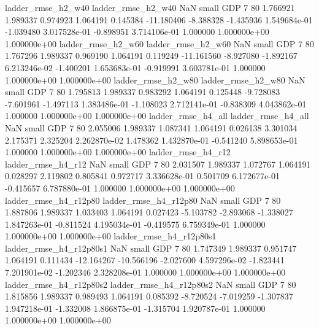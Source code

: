       ladder_rmse_h2_w40       ladder_rmse_h2_w40                   NaN      small      GDP                 7 80 1.766921       1.989337 0.974923       1.064191    0.145384    -11.180406     -8.388328    -1.435936   1.549684e-01 -1.039480 3.017528e-01    -0.898951   3.714106e-01            1.000000    1.000000e+00        1.000000e+00
      ladder_rmse_h2_w60       ladder_rmse_h2_w60                   NaN      small      GDP                 7 80 1.767296       1.989337 0.969190       1.064191    0.119249    -11.161560     -8.927080    -1.892167   6.213246e-02 -1.400201 1.653683e-01    -0.919991   3.603781e-01            1.000000    1.000000e+00        1.000000e+00
      ladder_rmse_h2_w80       ladder_rmse_h2_w80                   NaN      small      GDP                 7 80 1.795813       1.989337 0.983292       1.064191    0.125448     -9.728083     -7.601961    -1.497113   1.383486e-01 -1.108023 2.712141e-01    -0.838309   4.043862e-01            1.000000    1.000000e+00        1.000000e+00
      ladder_rmse_h4_all       ladder_rmse_h4_all                   NaN      small      GDP                 7 80 2.055006       1.989337 1.087341       1.064191    0.026138      3.301034      2.175371     2.325204   2.262870e-02  1.478362 1.432870e-01    -0.541240   5.898653e-01            1.000000    1.000000e+00        1.000000e+00
      ladder_rmse_h4_r12       ladder_rmse_h4_r12                   NaN      small      GDP                 7 80 2.031507       1.989337 1.072767       1.064191    0.028297      2.119802      0.805841     0.972717   3.336628e-01  0.501709 6.172677e-01    -0.415657   6.787880e-01            1.000000    1.000000e+00        1.000000e+00
   ladder_rmse_h4_r12p80    ladder_rmse_h4_r12p80                   NaN      small      GDP                 7 80 1.887806       1.989337 1.033403       1.064191    0.027423     -5.103782     -2.893068    -1.338027   1.847263e-01 -0.811524 4.195034e-01    -0.419575   6.759349e-01            1.000000    1.000000e+00        1.000000e+00
 ladder_rmse_h4_r12p80s1  ladder_rmse_h4_r12p80s1                   NaN      small      GDP                 7 80 1.747349       1.989337 0.951747       1.064191    0.111434    -12.164267    -10.566196    -2.027600   4.597296e-02 -1.823441 7.201901e-02    -1.202346   2.328208e-01            1.000000    1.000000e+00        1.000000e+00
 ladder_rmse_h4_r12p80s2  ladder_rmse_h4_r12p80s2                   NaN      small      GDP                 7 80 1.815856       1.989337 0.989493       1.064191    0.085392     -8.720524     -7.019259    -1.307837   1.947218e-01 -1.332008 1.866875e-01    -1.315704   1.920787e-01            1.000000    1.000000e+00        1.000000e+00
